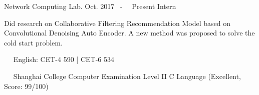 \documentclass{sorahjy_cv}
\begin{document}
\begin{sectionContentNormal}{Network Computing Lab. }{Oct. 2017 \ - \ \ Present }{Intern \ \ }
	\item Did research on Collaborative Filtering Recommendation Model based on Convolutional Denoising Auto Encoder. A new method was proposed to solve the cold start problem.
\end{sectionContentNormal}

%
%



%
%

\begin{description}{}
	\item{\ \ } English: CET-4 590 | CET-6 534
	\item{\ \ } Shanghai College Computer Examination Level II C Language (Excellent, Score: 99/100)
\end{description}





\end{document}
